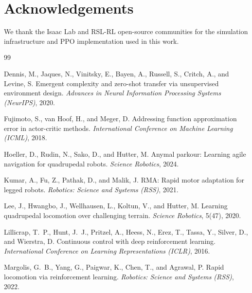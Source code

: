 \documentclass{article}
\begin{document}
\section*{Acknowledgements}

We thank the Isaac Lab and RSL-RL open-source communities for the simulation
infrastructure and PPO implementation used in this work.


\begin{thebibliography}{99}

Dennis, M., Jaques, N., Vinitsky, E., Bayen, A., Russell, S., Critch, A.,
and Levine, S.
\newblock Emergent complexity and zero-shot transfer via unsupervised
environment design.
\newblock \emph{Advances in Neural Information Processing Systems (NeurIPS)},
2020.

Fujimoto, S., van Hoof, H., and Meger, D.
\newblock Addressing function approximation error in actor-critic methods.
\newblock \emph{International Conference on Machine Learning (ICML)}, 2018.

Hoeller, D., Rudin, N., Sako, D., and Hutter, M.
\newblock Anymal parkour: Learning agile navigation for quadrupedal robots.
\newblock \emph{Science Robotics}, 2024.

Kumar, A., Fu, Z., Pathak, D., and Malik, J.
\newblock RMA: Rapid motor adaptation for legged robots.
\newblock \emph{Robotics: Science and Systems (RSS)}, 2021.

Lee, J., Hwangbo, J., Wellhausen, L., Koltun, V., and Hutter, M.
\newblock Learning quadrupedal locomotion over challenging terrain.
\newblock \emph{Science Robotics}, 5(47), 2020.

Lillicrap, T.~P., Hunt, J.~J., Pritzel, A., Heess, N., Erez, T., Tassa, Y.,
Silver, D., and Wierstra, D.
\newblock Continuous control with deep reinforcement learning.
\newblock \emph{International Conference on Learning Representations (ICLR)},
2016.

Margolis, G.~B., Yang, G., Paigwar, K., Chen, T., and Agrawal, P.
\newblock Rapid locomotion via reinforcement learning.
\newblock \emph{Robotics: Science and Systems (RSS)}, 2022.


\end{thebibliography}
\end{document}
